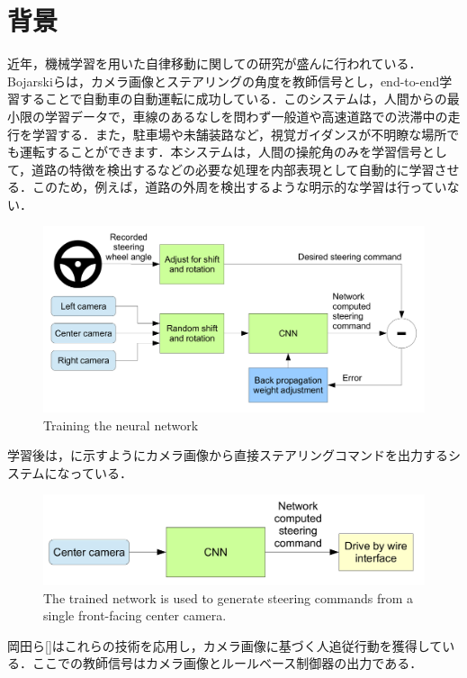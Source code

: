 
\section{背景}
近年，機械学習を用いた自律移動に関しての研究が盛んに行われている．
Bojarskiら\cite{bojarski}は，カメラ画像とステアリングの角度を教師信号とし，end-to-end学習することで自動車の自動運転に成功している．このシステムは，人間からの最小限の学習データで，車線のあるなしを問わず一般道や高速道路での渋滞中の走行を学習する．また，駐車場や未舗装路など，視覚ガイダンスが不明瞭な場所でも運転することができます．本システムは，人間の操舵角のみを学習信号として，道路の特徴を検出するなどの必要な処理を内部表現として自動的に学習させる．このため，例えば，道路の外周を検出するような明示的な学習は行っていない．

\begin{figure}[hbtp]
     \centering
    \includegraphics[keepaspectratio, scale=0.16]
         {images/bojarski_train.png}
    \caption{Training the neural network \cite{bojarski}}
    \label{Fig:bojarski_train}
\end{figure}

学習後は，に示すようにカメラ画像から直接ステアリングコマンドを出力するシステムになっている．

\begin{figure}[hbtp]
     \centering
    \includegraphics[keepaspectratio, scale=0.16]
         {images/bojarski_test.png}
    \caption{The trained network is used to generate steering commands from a single front-facing center camera. \cite{bojarski}}
    \label{Fig:bojarski_test}
\end{figure}

岡田ら[]はこれらの技術を応用し，カメラ画像に基づく人追従行動を獲得している．ここでの教師信号はカメラ画像とルールベース制御器の出力である．
\newpage
